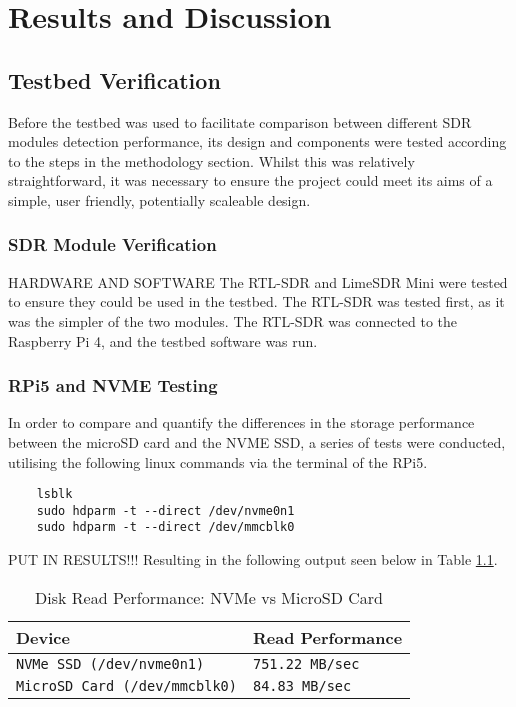 \chapter{Results and Discussion \label{sec:results}}

\section{Testbed Verification \label{sec:testbedResults}}
Before the testbed was used to facilitate comparison between different SDR modules detection performance, its design and components were tested according to the steps in the methodology section. Whilst this was relatively straightforward, it was necessary to ensure the project could meet its aims of a simple, user friendly, potentially scaleable design. 

\subsection{SDR Module Verification \label{sec:sdrVerification}}
HARDWARE AND SOFTWARE
The RTL-SDR and LimeSDR Mini were tested to ensure they could be used in the testbed. The RTL-SDR was tested first, as it was the simpler of the two modules. The RTL-SDR was connected to the Raspberry Pi 4, and the testbed software was run. 

\subsection{RPi5 and NVME Testing \label{sec:sbcVerification}}
In order to compare and quantify the differences in the storage performance between the microSD card and the NVME SSD, a series of tests were conducted, utilising the following linux commands via the terminal of the RPi5.

\begin{verbatim}
    lsblk
    sudo hdparm -t --direct /dev/nvme0n1 
    sudo hdparm -t --direct /dev/mmcblk0
\end{verbatim}
PUT IN RESULTS!!!
\noindent Resulting in the following output seen below in Table \ref{tab:diskperf}.

\begin{table}[h!]
    \centering
    \caption{Disk Read Performance: NVMe vs MicroSD Card \label{tab:diskperf}}
    \begin{tabular}{|l|l|}
    \hline
    \textbf{Device} & \textbf{Read Performance} \\ \hline
    \texttt{NVMe SSD (\texttt{/dev/nvme0n1})} & \texttt{751.22 MB/sec} \\ \hline
    \texttt{MicroSD Card (\texttt{/dev/mmcblk0})} & \texttt{84.83 MB/sec} \\ \hline
    \end{tabular}
\end{table}

